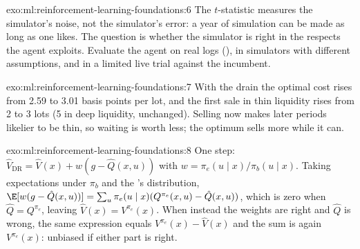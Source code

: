 \begin{solution}{exo:ml:reinforcement-learning-foundations:6}
The $t$-statistic measures the simulator's noise, not the simulator's error: a year of simulation can be made as long as one
likes. The question is whether the simulator is right in the respects the agent exploits. Evaluate the agent on real logs
(), in simulators with different assumptions, and in a limited live trial against the incumbent.
\end{solution}

\begin{solution}{exo:ml:reinforcement-learning-foundations:7}
With the drain the optimal cost rises from 2.59 to 3.01 basis points per lot, and the first sale in thin liquidity rises
from 2 to 3 lots (5 in deep liquidity, unchanged). Selling now makes later periods likelier to be thin, so waiting is worth
less; the optimum sells more while it can.
\end{solution}

\begin{solution}{exo:ml:reinforcement-learning-foundations:8}
One step: $\hat V_{\mathrm{DR}} = \hat V(x) + w(g - \hat Q(x, u))$ with $w = \pi_e(u\mid x)/\pi_b(u\mid x)$. Taking
expectations under $\pi_b$ and the 's distribution, $\E[w(g - \hat Q(x, u))] = \sum_u\pi_e(u\mid x)(Q^{\pi_e}(x, u) -
\hat Q(x, u))$, which is zero when $\hat Q = Q^{\pi_e}$, leaving $\hat V(x) = V^{\pi_e}(x)$. When instead the weights are
right and $\hat Q$ is wrong, the same expression equals $V^{\pi_e}(x) - \hat V(x)$ and the sum is again $V^{\pi_e}(x)$:
unbiased if either part is right.
\end{solution}

